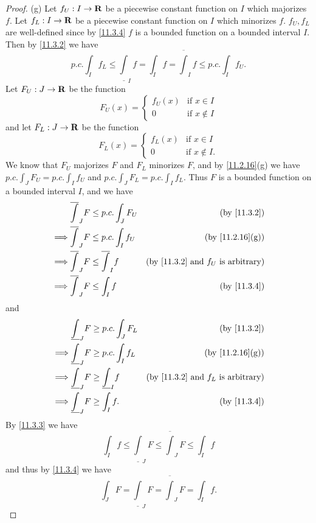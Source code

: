 \begin{proof}{(g)}
  Let \(f_U : I \to \mathbf{R}\) be a piecewise constant function on \(I\) which majorizes \(f\).
  Let \(f_L : I \to \mathbf{R}\) be a piecewise constant function on \(I\) which minorizes \(f\).
  \(f_U, f_L\) are well-defined since by \cref{11.3.4} \(f\) is a bounded function on a bounded interval \(I\).
  Then by \cref{11.3.2} we have
  \[
    p.c. \int_I f_L \leq \underline{\int}_I f = \int_I f = \overline{\int}_I f \leq p.c. \int_I f_U.
  \]
  Let \(F_U : J \to \mathbf{R}\) be the function
  \[
    F_U(x) = \begin{cases}
      f_U(x) & \text{if } x \in I    \\
      0      & \text{if } x \notin I
    \end{cases}
  \]
  and let \(F_L : J \to \mathbf{R}\) be the function
  \[
    F_L(x) = \begin{cases}
      f_L(x) & \text{if } x \in I     \\
      0      & \text{if } x \notin I.
    \end{cases}
  \]
  We know that \(F_U\) majorizes \(F\) and \(F_L\) minorizes \(F\), and by \cref{11.2.16}(g) we have \(p.c. \int_J F_U = p.c. \int_I f_U\) and \(p.c. \int_J F_L = p.c. \int_I f_L\).
  Thus \(F\) is a bounded function on a bounded interval \(I\), and we have
  \begin{align*}
             & \overline{\int}_J F \leq p.c. \int_J F_U     & \text{(by \cref{11.3.2})}                          \\
    \implies & \overline{\int}_J F \leq p.c. \int_I f_U     & \text{(by \cref{11.2.16}(g))}                      \\
    \implies & \overline{\int}_J F \leq \overline{\int}_I f & \text{(by \cref{11.3.2} and \(f_U\) is arbitrary)} \\
    \implies & \overline{\int}_J F \leq \int_I f            & \text{(by \cref{11.3.4})}
  \end{align*}
  and
  \begin{align*}
             & \underline{\int}_J F \geq p.c. \int_J F_L      & \text{(by \cref{11.3.2})}                          \\
    \implies & \underline{\int}_J F \geq p.c. \int_I f_L      & \text{(by \cref{11.2.16}(g))}                      \\
    \implies & \underline{\int}_J F \geq \underline{\int}_I f & \text{(by \cref{11.3.2} and \(f_L\) is arbitrary)} \\
    \implies & \underline{\int}_J F \geq \int_I f.            & \text{(by \cref{11.3.4})}
  \end{align*}
  By \cref{11.3.3} we have
  \[
    \int_I f \leq \underline{\int}_J F \leq \overline{\int}_J F \leq \int_I f
  \]
  and thus by \cref{11.3.4} we have
  \[
    \int_J F = \underline{\int}_J F = \overline{\int}_J F = \int_I f.
  \]
\end{proof}

